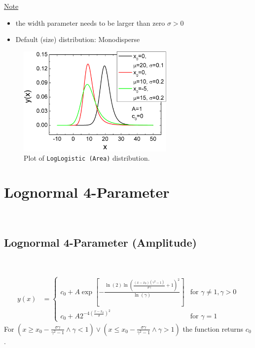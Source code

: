 \uline{Note}
\begin{itemize}
  \item the width parameter needs to be larger than zero $\sigma > 0$
  \item Default (size) distribution: Monodisperse
\end{itemize}


\begin{figure}[htb]
\begin{center}
\includegraphics[width=0.6824\textwidth]{LogLogisticArea.png}
\end{center}
\caption{Plot of \texttt{LogLogistic (Area)} distribution.}
\label{fig:LogLogisticArea}
\end{figure}
\clearpage

\section{Lognormal 4-Parameter} ~\\
\label{sec:LogNormal4Parameter}
\subsection{Lognormal 4-Parameter (Amplitude)} ~\\
\label{sec:LogNormal4ParameterAmplitude}

\begin{align}
y(x) & =
\begin{cases}
c_0+A \exp\left[ - \frac{\ln(2)\ln\left(\frac{(x-x_0)(\gamma^2-1)}{\sigma\gamma}+1\right)^2}{\ln(\gamma)}\right] & \mbox{for } \gamma \neq 1, \gamma > 0 \\
c_0+A 2^{-4\left(\frac{x-x_0}{\sigma}\right)^2} & \mbox{for } \gamma = 1
\end{cases}
\end{align}
For $\left(x \geq x_0-\frac{\sigma\gamma}{\gamma^2-1} \wedge \gamma < 1\right)
\vee \left(x \leq x_0-\frac{\sigma\gamma}{\gamma^2-1} \wedge \gamma > 1\right)$ the function returns $c_0$.
\vspace{2mm}

